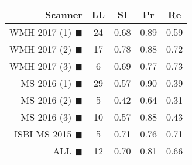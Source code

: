 \begin{tabular}{rcccc}
\toprule
Scanner & LL & SI & Pr & Re \\
\midrule
WMH 2017 (1) {\color[rgb]{ 1.00 0.00 0.00}$\blacksquare$} & 24 & 0.68 & 0.89 & 0.59 \\
WMH 2017 (2) {\color[rgb]{ 1.00 0.50 0.00}$\blacksquare$} & 17 & 0.78 & 0.88 & 0.72 \\
WMH 2017 (3) {\color[rgb]{ 1.00 0.80 0.00}$\blacksquare$} & 6 & 0.69 & 0.77 & 0.73 \\
MS  2016 (1) {\color[rgb]{ 0.20 0.80 0.00}$\blacksquare$} & 29 & 0.57 & 0.90 & 0.39 \\
MS  2016 (2) {\color[rgb]{ 0.00 0.40 1.00}$\blacksquare$} & 5 & 0.42 & 0.64 & 0.31 \\
MS  2016 (3) {\color[rgb]{ 0.60 0.00 1.00}$\blacksquare$} & 10 & 0.57 & 0.88 & 0.43 \\
ISBI MS 2015 {\color[rgb]{ 1.00 0.00 1.00}$\blacksquare$} & 5 & 0.71 & 0.76 & 0.71 \\
\midrule
ALL {\color[rgb]{ 1.00 1.00 1.00}$\blacksquare$} & 12 & 0.70 & 0.81 & 0.66 \\
\bottomrule
\end{tabular}